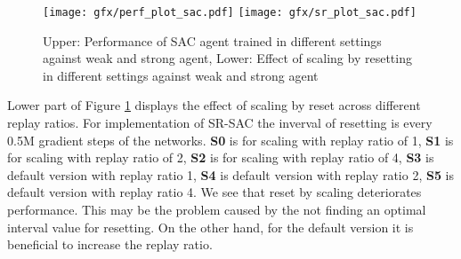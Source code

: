 \begin{figure}
    \centering
    \texttt{[image: gfx/perf\_plot\_sac.pdf]}
    \texttt{[image: gfx/sr\_plot\_sac.pdf]}
    \caption{Upper: Performance of SAC agent trained in different settings against weak and strong agent, Lower: Effect of scaling by resetting in different settings against weak and strong agent}
    \label{fig:perf_plot_sac}
\end{figure}

Lower part of Figure  \ref{fig:perf_plot_sac} displays the effect of scaling by reset across different replay ratios. For implementation of SR-SAC the inverval of resetting is every 0.5M gradient steps of the networks. \textbf{S0} is for scaling with replay ratio of 1, \textbf{S1} is for scaling with replay ratio of 2, \textbf{S2} is for scaling with replay ratio of 4, \textbf{S3} is default version with replay ratio 1, \textbf{S4} is default version with replay ratio 2, \textbf{S5} is default version with replay ratio 4. We see that reset by scaling deteriorates performance. This may be the problem caused by the not finding an optimal interval value for resetting. On the other hand, for the default version it is beneficial to increase the replay ratio.

 


 
